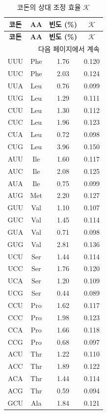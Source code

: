 \documentclass[12pt,a4paper]{article}
\newcommand{\REL}{\mathcal{K}}          %
\begin{document}
	\begin{longtable}{|c|c|c|c|}
		\caption{코돈의 상대 조정 효율 \(\REL\)}\label{tab:codons}\\
		\hline
		\textbf{코돈} & \textbf{AA} & \textbf{빈도 (\%)} & \(\REL\) \\
		\hline
		\endfirsthead
		\hline
		\textbf{코돈} & \textbf{AA} & \textbf{빈도 (\%)} & \(\REL\) \\
		\hline
		\endhead
		\hline
		\multicolumn{4}{r}{다음 페이지에서 계속}\\
		\endfoot
		\hline
		\endlastfoot
		UUU & Phe & 1.76 & 0.120 \\
		UUC & Phe & 2.03 & 0.124 \\
		UUA & Leu & 0.76 & 0.099 \\
		UUG & Leu & 1.29 & 0.111 \\
		CUU & Leu & 1.30 & 0.112 \\
		CUC & Leu & 1.96 & 0.123 \\
		CUA & Leu & 0.72 & 0.098 \\
		CUG & Leu & 3.96 & 0.150 \\
		AUU & Ile & 1.60 & 0.117 \\
		AUC & Ile & 2.08 & 0.125 \\
		AUA & Ile & 0.75 & 0.099 \\
		AUG & Met & 2.20 & 0.127 \\
		GUU & Val & 1.10 & 0.107 \\
		GUC & Val & 1.45 & 0.114 \\
		GUA & Val & 0.71 & 0.098 \\
		GUG & Val & 2.81 & 0.136 \\
		UCU & Ser & 1.44 & 0.114 \\
		UCC & Ser & 1.76 & 0.120 \\
		UCA & Ser & 1.20 & 0.109 \\
		UCG & Ser & 0.44 & 0.089 \\
		CCU & Pro & 1.62 & 0.117 \\
		CCC & Pro & 1.98 & 0.123 \\
		CCA & Pro & 1.66 & 0.118 \\
		CCG & Pro & 0.68 & 0.097 \\
		ACU & Thr & 1.22 & 0.110 \\
		ACC & Thr & 1.89 & 0.122 \\
		ACA & Thr & 1.44 & 0.114 \\
		ACG & Thr & 0.59 & 0.094 \\
		GCU & Ala & 1.84 & 0.121 \\

\end{longtable}
\end{document}
